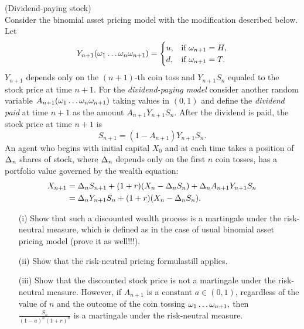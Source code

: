 \begin{solution}
\begin{solution}
\begin{problem}
 (Dividend-paying stock) \\
Consider the binomial asset pricing model
with the modification described below. Let
\[
Y_{n+1}(\omega_1\dots\omega_n\omega_{n+1})=
\begin{cases}
u,&\text{if }\omega_{n+1}=H,\\
d,&\text{if }\omega_{n+1}=T.
\end{cases}
\]
\ni $Y_{n+1}$ depends only on the $(n+1)$-th coin toss and $Y_{n+1}S_n$ equaled to the
stock price at time $n+1$. For the \emph{dividend-paying model} consider another random
variable $A_{n+1}(\omega_1\dots\omega_n\omega_{n+1})$ taking values in $(0,1)$ and define
the \emph{dividend paid} at time $n+1$ as the amount $A_{n+1}Y_{n+1}S_n.$ After the dividend
is paid, the stock price at time $n+1$ is
\[
S_{n+1}=(1-A_{n+1})Y_{n+1}S_n.
\]
\ni An agent who begins with initial capital $X_0$ and at each time takes a position of
$\Delta_n$ shares of stock, where $\Delta_n$ depends only on the first $n$ coin tosses, has
a portfolio value governed by the wealth equation:
\begin{align}
X_{n+1}&=\Delta_n S_{n+1}+(1+r) (X_n-\Delta_n S_n) +\Delta_n A_{n+1} Y_{n+1} S_n \\
&=\Delta_n Y_{n+1} S_n+(1+r)(X_n-\Delta_n S_n).
\end{align}
\begin{itemize}
\item[(i)] Show that such a discounted wealth process is a martingale under the
risk-neutral measure, which is defined as in the case of usual binomial asset pricing model
(prove it as well!!!).

\item[(ii)] Show that the risk-neutral pricing formulastill applies.

\item[(iii)] Show that the discounted stock price is not a martingale under the
risk-neutral measure. However, if $A_{n+1}$ is a constant $a\in(0,1)$, regardless of the value of
$n$  and the outcome of the coin tossing $\omega_1\dots\omega_{n+1},$ then $\frac{S_n}{(1-a)^n(1+r)^n}$ is
a martingale under the risk-neutral measure.
\end{itemize}
\end{problem} 
\begin{solution} 

\end{solution}


\end{solution}
\end{solution}
